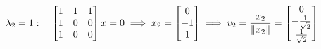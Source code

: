 \documentclass[preview]{standalone}
\begin{document}
\begin{align*}
\special{dvisvgm:raw <g id='unique000'>}\lambda_2 = 1: \special{dvisvgm:raw </g>}\special{dvisvgm:raw <g id='unique001'>}\quad \begin{bmatrix} 1 & 1 & 1 \\ 1 & 0 & 0 \\ 1 & 0 & 0 \end{bmatrix} x = 0 \special{dvisvgm:raw </g>}\special{dvisvgm:raw <g id='unique002'>}\implies x_2 = \begin{bmatrix} 0 \\ -1 \\ 1 \end{bmatrix} \special{dvisvgm:raw </g>}\special{dvisvgm:raw <g id='unique003'>}\implies v_2 = \frac{x_2}{\|x_2\|} = \begin{bmatrix} 0 \\ -\frac{1}{\sqrt{2}} \\ \frac{1}{\sqrt{2}} \end{bmatrix}\special{dvisvgm:raw </g>}
\end{align*}
\end{document}
